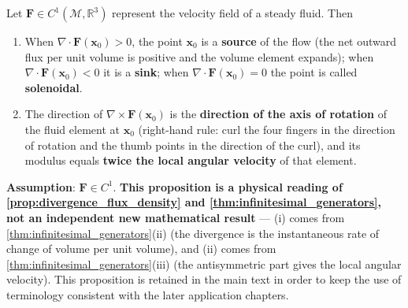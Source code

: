 \begin{proposition}\label{prop:divergence_meaning}
Let $\mathbf{F} \in C^1(\mathcal{M}, \mathbb{R}^3)$ represent the velocity field of a steady fluid. Then
\begin{enumerate}[label=(\roman*)]
    \item When $\nabla \cdot \mathbf{F}(\mathbf{x}_0) > 0$, the point $\mathbf x_0$ is a \textbf{source} of the flow (the net outward flux per unit volume is positive and the volume element expands); when $\nabla \cdot \mathbf{F}(\mathbf{x}_0) < 0$ it is a \textbf{sink}; when $\nabla \cdot \mathbf{F}(\mathbf{x}_0) = 0$ the point is called \textbf{solenoidal}.
    \item The direction of $\nabla \times \mathbf{F}(\mathbf{x}_0)$ is the \textbf{direction of the axis of rotation} of the fluid element at $\mathbf x_0$ (right-hand rule: curl the four fingers in the direction of rotation and the thumb points in the direction of the curl), and its modulus equals \textbf{twice the local angular velocity} of that element.
\end{enumerate}

\textbf{Assumption}: $\mathbf F\in C^1$. \textbf{This proposition is a physical reading of \cref{prop:divergence_flux_density} and \cref{thm:infinitesimal_generators}, not an independent new mathematical result} --- (i) comes from \cref{thm:infinitesimal_generators}(ii) (the divergence is the instantaneous rate of change of volume per unit volume), and (ii) comes from \cref{thm:infinitesimal_generators}(iii) (the antisymmetric part gives the local angular velocity). This proposition is retained in the main text in order to keep the use of terminology consistent with the later application chapters.
\end{proposition}

